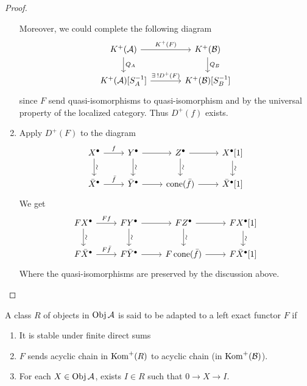 \begin{prop}
\begin{proof}
\begin{enumerate}
        Moreover, we could complete the following diagram
        \[ \begin{tikzcd}[column sep=large]
            K^+(\Ac) \ar[r, "K^+(F)"] \ar[d, "Q_A"] &
            K^+(\Bc) \ar[d, "Q_B"] \\
            K^+(\Ac)[S_A^{-1}] \ar[r, "\exists ! D^+(F)"] & K^+(\Bc)[S_B^{-1}]
          \end{tikzcd} \]
        since $F$ send quasi-isomorphisms to quasi-isomorphism
        and by the universal property of the localized category.
        Thus $D^+(f)$ exists.
      \item Apply $D^+(F)$ to the diagram
        \[ \begin{tikzcd}
            X^\bullet \ar[r, "f"] \ar[d, "\rotatebox{90}{\(\sim\)}"] &
            Y^\bullet \ar[r] \ar[d, "\rotatebox{90}{\(\sim\)}"] &
            Z^\bullet \ar[r] \ar[d, "\rotatebox{90}{\(\sim\)}"] &
            X^\bullet[1] \ar[d, "\rotatebox{90}{\(\sim\)}"] \\
            \bar{X}^\bullet \ar[r, "\bar{f}"] &
            \bar{Y}^\bullet \ar[r] &
            \cone(\bar{f}) \ar[r] &
            \bar{X}^\bullet[1]
        \end{tikzcd} \]
        We get
        \[ \begin{tikzcd}
            F X^\bullet \ar[r, "F f"] \ar[d, "\rotatebox{90}{\(\sim\)}"] &
            F Y^\bullet \ar[r] \ar[d, "\rotatebox{90}{\(\sim\)}"] &
            F Z^\bullet \ar[r] \ar[d, "\rotatebox{90}{\(\sim\)}"] &
            F X^\bullet[1] \ar[d, "\rotatebox{90}{\(\sim\)}"] \\
            F \bar{X}^\bullet \ar[r, "F \bar{f}"] &
            F \bar{Y}^\bullet \ar[r] &
            F \cone(\bar{f}) \ar[r] &
            F \bar{X}^\bullet[1]
        \end{tikzcd} \]
        Where the quasi-isomorphisms are preserved by the discussion above.
    \end{enumerate}
  \end{proof}
\end{prop}

\begin{definition}
  A class $R$ of objects in $\operatorname{Obj} \mathcal{A}$ is said to
  be adapted to a left exact functor $F$ if
  \begin{enumerate}
    \item It is stable under finite direct sums
    \item $F$ sends acyclic chain in $\operatorname{Kom}^+(R)$ to acyclic chain (in $\operatorname{Kom}^+(\mathcal{B})$).
    \item For each $X \in \operatorname{Obj} \mathcal{A}$, exists $I \in R$ such that $0 \to X \to I$.
  \end{enumerate}
\end{definition}

